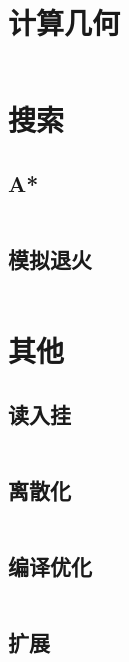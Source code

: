 \documentclass[a4paper,6pt]{article}
\begin{document}
\newpage
\section{计算几何}
\inputminted[breaklines]{c++}{geometry.cpp}

\newpage
\section{搜索}
\subsection{A*}
\inputminted[breaklines]{c++}{search/Astar.cpp}
\subsection{模拟退火}
\inputminted[breaklines]{c++}{search/SA.cpp}

\newpage
\section{其他}
\subsection{读入挂}
\inputminted[breaklines]{c++}{other/fastIO.cpp}
\subsection{离散化}
\inputminted[breaklines]{c++}{other/LSH.cpp}
\subsection{编译优化}
\inputminted[breaklines]{c++}{other/Ofast.cpp}
\subsection{扩展}
\inputminted[breaklines]{c++}{other/ext.cpp}
\end{document}
